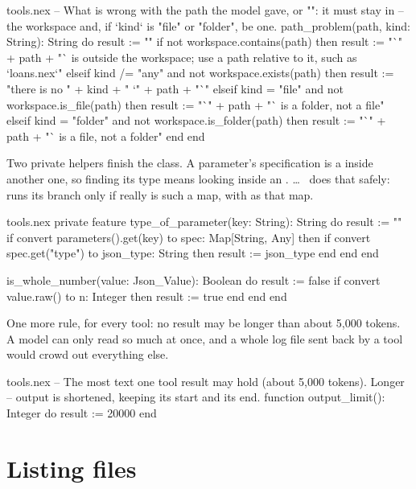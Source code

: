 \begin{continued}{tools.nex}
  -- What is wrong with the path the model gave, or "": it must stay in
  -- the workspace and, if `kind` is "file" or "folder", be one.
  path_problem(path, kind: String): String do
    result := ""
    if not workspace.contains(path) then
      result := "`" + path + "` is outside the workspace; use a path relative to it, such as `loans.nex`"
    elseif kind /= "any" and not workspace.exists(path) then
      result := "there is no " + kind + " `" + path + "`"
    elseif kind = "file" and not workspace.is_file(path) then
      result := "`" + path + "` is a folder, not a file"
    elseif kind = "folder" and not workspace.is_folder(path) then
      result := "`" + path + "` is a file, not a folder"
    end
  end
\end{continued}

Two private helpers finish the class. A parameter's specification is a
 inside another one, so finding its type means
looking inside an .  \ldots\  does that
safely:  runs its branch only
if  really is such a map, with  as that map.

\begin{continued}{tools.nex}
  private feature
    type_of_parameter(key: String): String do
      result := ""
      if convert parameters().get(key) to spec: Map[String, Any] then
        if convert spec.get("type") to json_type: String then
          result := json_type
        end
      end
    end

    is_whole_number(value: Json_Value): Boolean do
      result := false
      if convert value.raw() to n: Integer then
        result := true
      end
    end
end
\end{continued}

One more rule, for every tool: no result may be longer than about 5,000
tokens. A model can only read so much at once, and a whole log file sent
back by a tool would crowd out everything else.

\begin{append}{tools.nex}
-- The most text one tool result may hold (about 5,000 tokens). Longer
-- output is shortened, keeping its start and its end.
function output_limit(): Integer do
  result := 20000
end
\end{append}

\section{Listing files}


